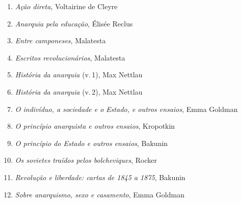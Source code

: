 
%


%




\begin{enumerate}
\setlength{\topsep}{2pt}
\setlength{\partopsep}{0pt}
\setlength\parskip{4.2pt}
\setlength\itemsep{-1.4mm}
\item \textit{Ação direta}, Voltairine de Cleyre
\item \textit{Anarquia pela educação}, Élisée Reclus
\item \textit{Entre camponeses}, Malatesta
\item \textit{Escritos revolucionários}, Malatesta
\item \textit{História da anarquia} (v.\,1), Max Nettlau
\item \textit{História da anarquia} (v.\,2), Max Nettlau
\item \textit{O indivíduo, a sociedade e o Estado, e outros ensaios}, Emma Goldman
\item \textit{O princípio anarquista e outros ensaios}, Kropotkin
\item \textit{O princípio do Estado e outros ensaios}, Bakunin
\item \textit{Os sovietes traídos pelos bolcheviques}, Rocker
\item \textit{Revolução e liberdade: cartas de 1845 a 1875}, Bakunin
\item \textit{Sobre anarquismo, sexo e casamento}, Emma Goldman
\end{enumerate}


